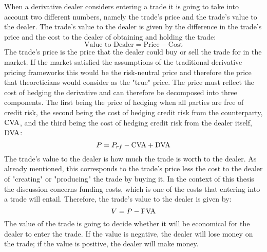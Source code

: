 \documentclass[main.tex]{subfiles}
\begin{document}
    When a derivative dealer considers entering a trade it is going to take into account
    two different numbers, namely the trade's price and the trade's value to the dealer.
    The trade's value to the dealer is given by the difference in the trade's price
    and the cost to the dealer of obtaining and holding the trade:
        \begin{equation}
            \text{Value to Dealer} 
            =
            \text{Price}
            -
            \text{Cost}
        \end{equation}
    The trade's price is the price that the dealer could buy or sell the trade for in the market.
    If the market satisfied the assumptions of the traditional derivative pricing frameworks
    this would be the risk-neutral price and therefore the price that 
    theoreticians would consider as the "true" price.
    The price must reflect the cost of hedging the derivative
    and can therefore be decomposed into three components. 
    The first being the price of hedging when all parties are free of credit risk, 
    the second being the cost of hedging credit risk from the counterparty, $\CVA/$,
    and the third being the cost of hedging credit risk from the dealer itself, $\DVA/$:
        \begin{equation}
            P = 
            P_{rf} 
            -
            \CVA/
            +
            \DVA/
        \end{equation}
    The trade's value to the dealer is how much the trade is worth to the dealer.
    As already mentioned, this corresponds to the trade's price less the cost to the dealer
    of "creating" or "producing" the trade by buying it.
    In the context of this thesis the discussion concerns funding costs,
    which is one of the costs that entering into a trade will entail.
    Therefore, the trade's value to the dealer is given by:
        \begin{equation}
            V = P - \FVA/
        \end{equation}
    The value of the trade is going to decide whether it will be economical 
    for the dealer to enter the trade. 
    If the value is negative, the dealer will lose money on the trade;
    if the value is positive, the dealer will make money.
    
\end{document}
